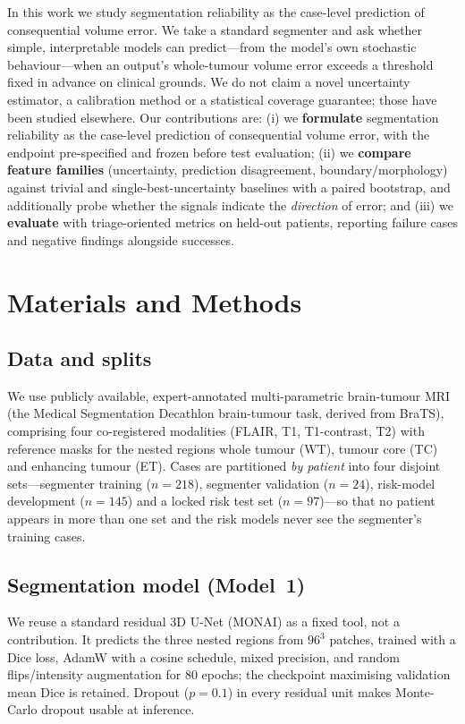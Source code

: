 \documentclass[11pt]{article}
\begin{document}
In this work we study segmentation reliability as the case-level prediction of
consequential volume error. We take a standard segmenter and ask whether simple,
interpretable models can predict---from the model's own stochastic behaviour---when an
output's whole-tumour volume error exceeds a threshold fixed in advance on clinical
grounds. We do not claim a novel uncertainty estimator, a calibration method or a
statistical coverage guarantee; those have been studied elsewhere. Our contributions
are: (i) we \textbf{formulate} segmentation reliability as the case-level prediction of
consequential volume error, with the endpoint pre-specified and frozen before test
evaluation; (ii) we \textbf{compare feature families} (uncertainty, prediction
disagreement, boundary/morphology) against trivial and single-best-uncertainty
baselines with a paired bootstrap, and additionally probe whether the signals indicate
the \emph{direction} of error; and (iii) we \textbf{evaluate} with triage-oriented
metrics on held-out patients, reporting failure cases and negative findings alongside
successes.

\section{Materials and Methods}

\subsection{Data and splits}
We use publicly available, expert-annotated multi-parametric brain-tumour MRI (the
Medical Segmentation Decathlon brain-tumour task, derived from BraTS), comprising four
co-registered modalities (FLAIR, T1, T1-contrast, T2) with reference masks for the
nested regions whole tumour (WT), tumour core (TC) and enhancing tumour (ET). Cases are
partitioned \emph{by patient} into four disjoint sets---segmenter training ($n{=}218$),
segmenter validation ($n{=}24$), risk-model development ($n{=}145$) and a locked risk
test set ($n{=}97$)---so that no patient appears in more than one set and the risk
models never see the segmenter's training cases.

\subsection{Segmentation model (Model~1)}
We reuse a standard residual 3D U-Net (MONAI) as a fixed tool, not a contribution. It
predicts the three nested regions from $96^{3}$ patches, trained with a Dice loss, AdamW
with a cosine schedule, mixed precision, and random flips/intensity augmentation for 80
epochs; the checkpoint maximising validation mean Dice is retained. Dropout ($p{=}0.1$)
in every residual unit makes Monte-Carlo dropout usable at inference.
\end{document}
